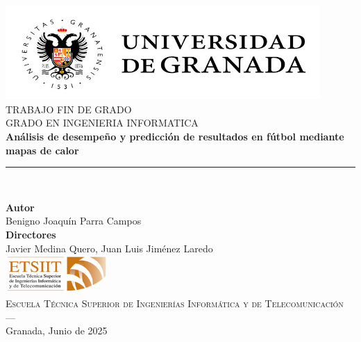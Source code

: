 \begin{titlepage}
 
 
\newlength{\centeroffset}
\setlength{\centeroffset}{-0.5\oddsidemargin}
\addtolength{\centeroffset}{0.5\evensidemargin}
\thispagestyle{empty}

\noindent\hspace*{\centeroffset}\begin{minipage}{\textwidth}

\centering
\includegraphics[width=0.9\textwidth]{imagenes/logo_ugr.jpg}\\[1.4cm]

\textsc{ \Large TRABAJO FIN DE GRADO\\[0.2cm]}
\textsc{ GRADO EN INGENIERIA INFORMATICA}\\[1cm]

{\huge\bfseries Análisis de desempeño y predicción de resultados en fútbol mediante mapas de calor \\}
\noindent\rule[-1ex]{\textwidth}{3pt}\\[3.5ex]
\end{minipage}

\vspace{2.5cm}
\noindent\hspace*{\centeroffset}
\begin{minipage}{\textwidth}
\centering

\textbf{Autor}\\ {Benigno Joaquín Parra Campos}\\[2.5ex]
\textbf{Directores}\\ {Javier Medina Quero, Juan Luis Jiménez Laredo}\\[2cm]
\includegraphics[width=0.3\textwidth]{imagenes/etsiit_logo.png}\\[0.1cm]
\textsc{Escuela Técnica Superior de Ingenierías Informática y de Telecomunicación}\\
\textsc{---}\\
Granada, Junio de 2025
\end{minipage}
\end{titlepage}

